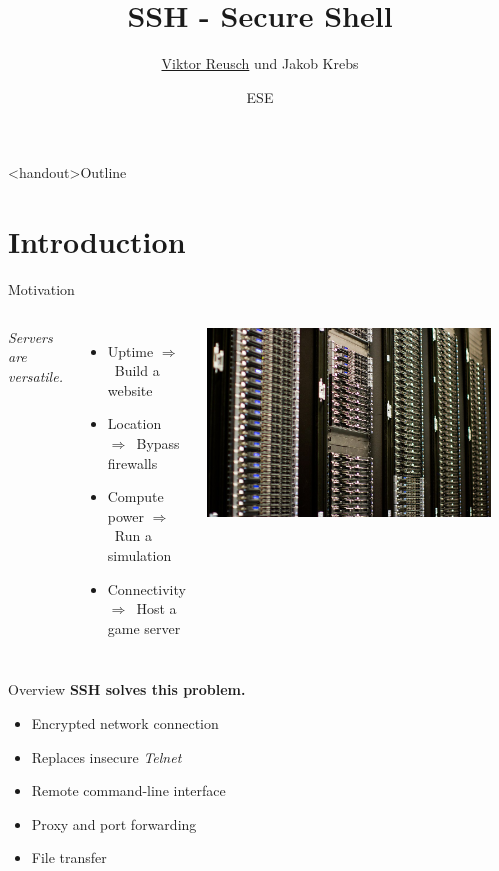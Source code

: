 \documentclass[10pt, graphics, aspectratio=169, table]{beamer}
\title{SSH - Secure Shell}
\author{\underline{Viktor Reusch} und Jakob Krebs}
\date{ESE \the\year{}}
\institute{Nerd::101 - ESE - ifsr - TU Dresden}
\newcommand{\ra}{$\Rightarrow$\ }
\begin{document}
\maketitle

\begin{frame}<handout>{Outline}
	\tableofcontents
\end{frame}

\section{Introduction}
\begin{frame}{Motivation}
\begin{columns}
		\emph{Servers are versatile.}
		\begin{itemize}
			\item Uptime \ra Build a website
			\item Location \ra Bypass firewalls
			\item Compute power \ra Run a simulation
			\item Connectivity \ra Host a game server
		\end{itemize}
		\includegraphics[width=\textwidth]{img/servers.jpg}

		\hfill \cite{servers}
\end{columns}
\end{frame}

\begin{frame}{Overview}
	\textbf{SSH solves this problem.}
	\begin{itemize}
		\item Encrypted network connection
		\item Replaces insecure \emph{Telnet}
		\item Remote command-line interface
		\item Proxy and port forwarding
		\item File transfer
	\end{itemize}
\end{frame}
\end{document}
